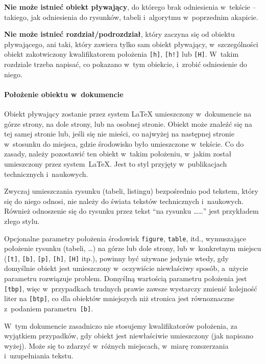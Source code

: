 {\bf Nie może istnieć obiekt pływający}, do którego brak odniesienia w~tekście -- takiego, jak odniesienia do rysunków, tabeli i~algorytmu w~poprzednim akapicie. 

{\bf Nie może istnieć rozdział/podrozdział}, który zaczyna się od obiektu pływającego, ani taki, który zawiera tylko sam obiekt pływający, w~szczególności obiekt zakotwiczony kwalifikatorem położenia {\tt [h]}, {\tt [h!]} lub {\tt [H]}. W~takim rozdziale trzeba napisać, co pokazano w~tym obiekcie, i~zrobić odniesienie do niego.


\paragraph{Położenie obiektu w~dokumencie}
\label{sec:dod:plywajace-dokument}

Obiekt pływający zostanie przez system \LaTeX{} umieszczony w~dokumencie na górze strony, na dole strony, lub na osobnej stronie. Obiekt może znaleźć się na tej samej stronie lub, jeśli się nie mieści, co najwyżej na następnej stronie w~stosunku do miejsca, gdzie środowisko było umieszczone w~tekście. Co do zasady, należy pozostawić ten obiekt w~takim położeniu, w~jakim został umieszczony przez system~\LaTeX. Jest to styl przyjęty w~publikacjach technicznych i~naukowych.

Zwyczaj umieszczania rysunku (tabeli, listingu) bezpośrednio pod tekstem, który się do niego odnosi, nie należy do świata tekstów technicznych i~naukowych. Również odnoszenie się do rysunku przez tekst ``na rysunku \dots {}\dots'' jest przykładem złego stylu.

Opcjonalne parametry położenia środowisk {\tt figure}, {\tt table}, itd., wymuszające położenie rysunku (tabeli, \dots) na górze lub dole strony, lub w~konkretnym miejscu ({\tt [t]}, {\tt [b]}, {\tt [p]}, {\tt [h]}, {\tt [H]} itp.), powinny być używane jedynie wtedy, gdy domyślnie obiekt jest umieszczony w~oczywiście niewłaściwy sposób, a~użycie parametru rozwiązuje problem. Domyślną wartością parametru położenia jest {\tt [tbp]}, więc w~przypadkach trudnych prawie zawsze wystarczy zmienić kolejność liter na {\tt [btp]}, co dla obiektów mniejszych niż stronica jest równoznaczne z~podaniem parametru~{\tt [b]}.

W~tym dokumencie zasadniczo nie stosujemy kwalifikatorów położenia, za wyjątkiem przypadków, gdy obiekt jest niewłaściwie umieszczony (jak napisano wyżej). Może się to zdarzyć w~różnych miejscach, w~miarę rozszerzania i~uzupełniania tekstu.


